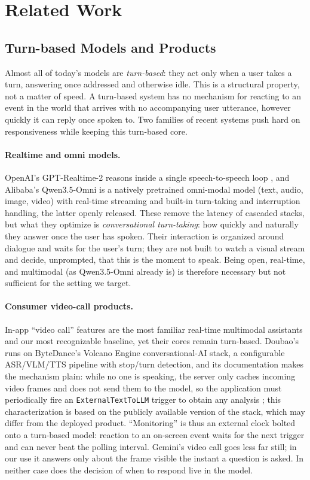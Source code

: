 \section{Related Work}

\subsection{Turn-based Models and Products}
\label{sec:product}
Almost all of today's models are \textit{turn-based}: they act only when a user takes a turn, answering once addressed and otherwise idle. This is a structural property, not a matter of speed. A turn-based system has no mechanism for reacting to an event in the world that arrives with no accompanying user utterance, however quickly it can reply once spoken to. Two families of recent systems push hard on responsiveness while keeping this turn-based core.

\paragraph{\textbf{Realtime and omni models.}} OpenAI's GPT-Realtime-2 reasons inside a single speech-to-speech loop \cite{openai2026gptrealtime2}, and Alibaba's Qwen3.5-Omni \cite{qwen2026omni} is a natively pretrained omni-modal model (text, audio, image, video) with real-time streaming and built-in turn-taking and interruption handling, the latter openly released. These remove the latency of cascaded stacks, but what they optimize is \textit{conversational turn-taking}: how quickly and naturally they answer once the user has spoken. Their interaction is organized around dialogue and waits for the user's turn; they are not built to watch a visual stream and decide, unprompted, that this is the moment to speak. Being open, real-time, and multimodal (as Qwen3.5-Omni already is) is therefore necessary but not sufficient for the setting we target.

\paragraph{\textbf{Consumer video-call products.}} In-app ``video call'' features are the most familiar real-time multimodal assistants and our most recognizable baseline, yet their cores remain turn-based. Doubao's runs on ByteDance's Volcano Engine conversational-AI stack, a configurable ASR/VLM/TTS pipeline with stop/turn detection, and its documentation makes the mechanism plain: while no one is speaking, the server only caches incoming video frames and does not send them to the model, so the application must periodically fire an \texttt{ExternalTextToLLM} trigger to obtain any analysis \cite{volcengine2026videounderstanding}; this characterization is based on the publicly available version of the stack, which may differ from the deployed product. ``Monitoring'' is thus an external clock bolted onto a turn-based model: reaction to an on-screen event waits for the next trigger and can never beat the polling interval. Gemini's video call goes less far still; in our use it answers only about the frame visible the instant a question is asked. In neither case does the decision of when to respond live in the model.

